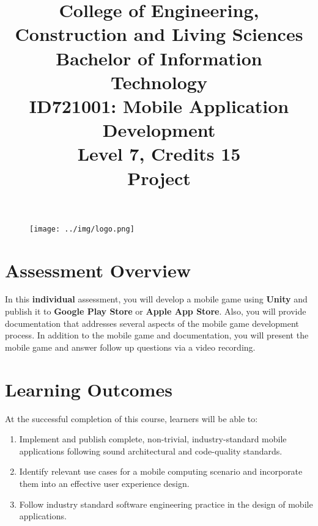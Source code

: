 \documentclass{article}
\author{}
\begin{document}
 

\begin{figure}
	\centering
	\texttt{[image: ../img/logo.png]}
\end{figure} 

\title{College of Engineering, Construction and Living Sciences\\Bachelor of Information Technology\\ID721001: Mobile Application Development\\Level 7, Credits 15\\\textbf{Project}}
\date{}
\maketitle

\section*{Assessment Overview}
In this \textbf{individual} assessment, you will develop a mobile game using \textbf{Unity} and publish it to \textbf{Google Play Store} or \textbf{Apple App Store}. Also, you will provide documentation that addresses several aspects of the mobile game development process. In addition to the mobile game and documentation, you will present the mobile game and answer follow up questions via a video recording.

\section*{Learning Outcomes}
At the successful completion of this course, learners will be able to:
\begin{enumerate}
	\item Implement and publish complete, non-trivial, industry-standard mobile applications following sound architectural and code-quality standards.
	\item Identify relevant use cases for a mobile computing scenario and incorporate them into an effective user experience design.
	\item Follow industry standard software engineering practice in the design of mobile applications.
\end{enumerate}
\end{document}
